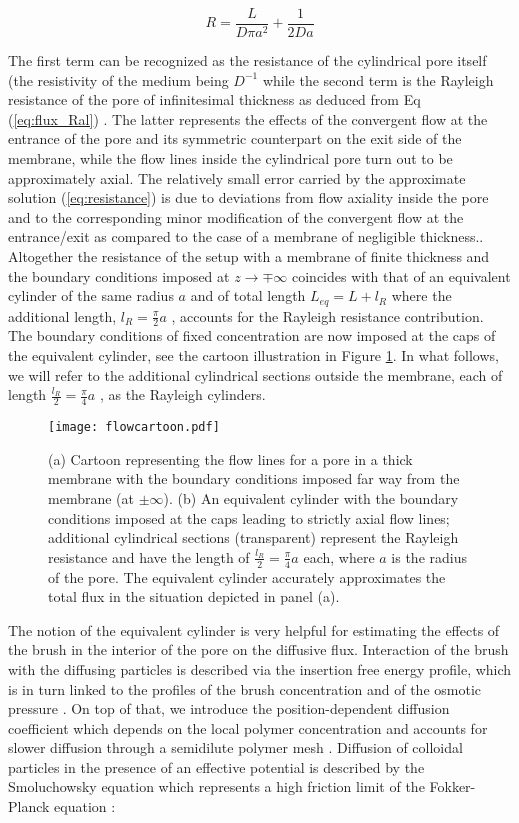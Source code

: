 \documentclass[12pt, a4paper]{article}
\begin{document}
\begin{equation}
R=\frac{L}{D\pi a^{2}}+\frac{1}{2Da}\label{eq:resistance}
\end{equation}

The first term can be recognized as the resistance of the cylindrical pore itself (the resistivity of the medium being $D^{-1}$ while the second term is the Rayleigh resistance of the pore of infinitesimal thickness as deduced from Eq  (\ref{eq:flux_Ral}) . The latter represents the effects of the convergent flow at the entrance of the pore and its symmetric counterpart on the exit side of the membrane, while the flow lines inside the cylindrical pore turn out to be approximately axial. The relatively small error carried by the approximate solution  (\ref{eq:resistance})  is due to deviations from flow axiality inside the pore and to the corresponding minor modification of the convergent flow at the entrance/exit as compared to the case of a membrane of negligible thickness.. 
Altogether the resistance of the setup with a membrane of finite thickness and the boundary conditions imposed at $z\rightarrow\mp\infty$ coincides with that of an equivalent cylinder of the same radius $a$ and of total length $L_{eq}=L+l_{R}$   where the additional length,  $l_{R}=\frac{\pi}{2}a$ , accounts for the Rayleigh resistance contribution. The boundary conditions of fixed concentration are now imposed at the caps of the equivalent cylinder, see the cartoon illustration in Figure \ref{fig:flow_cartoon}. In what follows, we will refer to the additional cylindrical sections outside the membrane, each of length $\frac{l_{R}}{2}=\frac{\pi}{4}a$ , as the Rayleigh cylinders.
 
 
\begin{figure}
    \centering
    \texttt{[image: flowcartoon.pdf]}
    \caption{ (a) Cartoon representing the flow lines for a pore in a thick membrane with the boundary conditions imposed far way from the membrane (at $\pm\infty$). (b) An equivalent cylinder with the boundary conditions imposed at the caps leading to strictly axial flow lines; additional cylindrical sections (transparent) represent the Rayleigh resistance and have the length of  $\frac{l_{R}}{2}=\frac{\pi}{4}a$  each, where $a$ is the radius of the pore. The equivalent cylinder accurately approximates the total flux in the situation depicted in panel (a).}
    \label{fig:flow_cartoon}
\end{figure}


The notion of the equivalent cylinder is very helpful for estimating the effects of the brush in the interior of the pore on the diffusive flux. Interaction of the brush with the diffusing particles is described via the insertion free energy profile, which is in turn linked to the profiles of the brush concentration and of the osmotic pressure \cite{Laktionov2023}. On top of that, we introduce the position-dependent diffusion coefficient which depends on the local polymer concentration and accounts for slower diffusion through a semidilute polymer mesh \cite{Laktionov2023}.
Diffusion of colloidal particles in the presence of an effective potential is described by the Smoluchowsky equation which represents a high friction limit of the Fokker-Planck equation \cite{Risken1996}:
\end{document}
